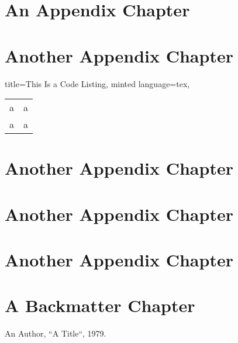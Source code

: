 \documentclass[a4paper,11pt,oneside,showtrims]{alpenthesis}
\begin{document}
\lipsum[2]

\appendix{}
\chapter{An Appendix Chapter}
\lipsum[1-3]

\chapter{Another Appendix Chapter}

\tikzset{external/export next=false}%
\begin{tcblisting}{%
        title=This Is a Code Listing,
        minted language=tex,
        }
    \begin{tabular}{ll}
        a & a \\
        a & a \\
    \end{tabular}
\end{tcblisting}

\tikzset{external/export next=false}%
\begin{tcolorbox}[title=test]
    \lipsum[2]
\end{tcolorbox}

\tikzset{external/export next=false}%
\begin{tcolorbox}
    \lipsum[2]
\end{tcolorbox}

\chapter{Another Appendix Chapter}
\lipsum[4-6]

\chapter{Another Appendix Chapter}
\lipsum[4-6]

\chapter{Another Appendix Chapter}
\lipsum[4-6]

\backmatter
\chapter{A Backmatter Chapter}
\lipsum[7-9]

\begin{thebibliography}{1}
        An Author, ``A Title``, 1979.
\end{thebibliography}
\end{document}
